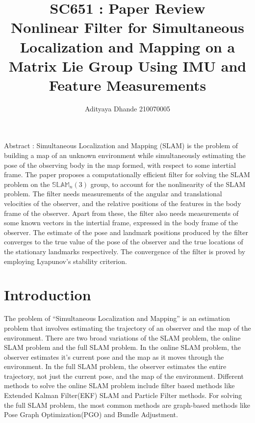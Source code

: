 \documentclass[12pt]{article}
\title{  \vspace{-0.5cm}
    SC651 : Paper Review \vspace{0cm} \\
 \textbf{Nonlinear Filter for Simultaneous Localization
 and Mapping on a Matrix Lie Group Using
 IMU and Feature Measurements}}
\author{Adityaya Dhande  \hspace{1cm} 210070005 }
\date{}
\begin{document}
\maketitle
\noindent
Abstract : Simultaneous Localization and Mapping (SLAM) is the problem of building a map of an unknown environment while simultaneously estimating the pose of the observing body in the map formed, with respect to some intertial frame. 
The paper proposes a computationally efficient filter for solving the SLAM problem on the $\mathbb{SLAM}_n(3)$ group, to account for the nonlinearity of the SLAM problem. 
The filter needs measurements of the angular and translational velocities of the observer, and the relative positions of the features in the body frame of the observer.
Apart from these, the filter also needs measurements of some known vectors in the intertial frame, expressed in the body frame of the observer.
The estimate of the pose and landmark positions produced by the filter converges to the true value of the pose of the observer 
and the true locations of the stationary landmarks respectively. The convergence of the filter 
is proved by employing Lyapunov's stability criterion. 



\section{Introduction}
The problem of ``Simultaneous Localization and Mapping'' is an estimation problem
that involves estimating the trajectory of an observer and the map of the environment.
There are two broad variations
of the SLAM problem, the online SLAM problem and the full SLAM problem. In
the online SLAM problem, the observer estimates it’s current pose and the map as it
moves through the environment. In the full SLAM problem, the observer estimates the
entire trajectory, not just the current pose, and the map of the environment.
Different
methods to solve the online SLAM problem include filter based methods like Extended
Kalman Filter(EKF) SLAM and Particle Filter methods. For solving the full SLAM
problem, the most common methods are graph-based methods like Pose Graph Optimization(PGO) and Bundle Adjustment.
\end{document}
